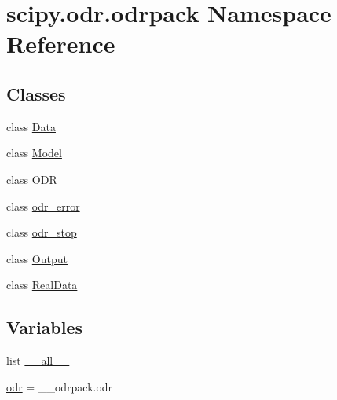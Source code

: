 \hypertarget{namespacescipy_1_1odr_1_1odrpack}{}\section{scipy.\+odr.\+odrpack Namespace Reference}
\label{namespacescipy_1_1odr_1_1odrpack}
\subsection*{Classes}
\begin{DoxyCompactItemize}
\item 
class \hyperlink{classscipy_1_1odr_1_1odrpack_1_1Data}{Data}
\item 
class \hyperlink{classscipy_1_1odr_1_1odrpack_1_1Model}{Model}
\item 
class \hyperlink{classscipy_1_1odr_1_1odrpack_1_1ODR}{O\+D\+R}
\item 
class \hyperlink{classscipy_1_1odr_1_1odrpack_1_1odr__error}{odr\+\_\+error}
\item 
class \hyperlink{classscipy_1_1odr_1_1odrpack_1_1odr__stop}{odr\+\_\+stop}
\item 
class \hyperlink{classscipy_1_1odr_1_1odrpack_1_1Output}{Output}
\item 
class \hyperlink{classscipy_1_1odr_1_1odrpack_1_1RealData}{Real\+Data}
\end{DoxyCompactItemize}
\subsection*{Variables}
\begin{DoxyCompactItemize}
\item 
list \hyperlink{namespacescipy_1_1odr_1_1odrpack_a22fc156aa61462fcc50dff98c62ce2aa}{\+\_\+\+\_\+all\+\_\+\+\_\+}
\item 
\hyperlink{namespacescipy_1_1odr_1_1odrpack_abf3cc466ed8f8669da1f87e61813bc18}{odr} = \+\_\+\+\_\+odrpack.\+odr
\end{DoxyCompactItemize}


